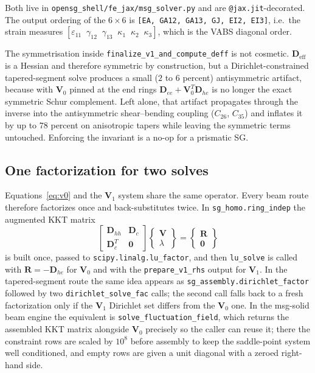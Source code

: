 Both live in \texttt{opensg\_shell/fe\_jax/msg\_solver.py} and are
\texttt{@jax.jit}-decorated. The output ordering of the $6\times6$ is
\texttt{[EA, GA12, GA13, GJ, EI2, EI3]}, i.e.\ the strain measures
$[\varepsilon_{11}\;\;\gamma_{12}\;\;\gamma_{13}\;\;\kappa_1\;\;\kappa_2\;\;\kappa_3]$,
which is the VABS diagonal order.

The symmetrisation inside \texttt{finalize\_v1\_and\_compute\_deff} is not
cosmetic. $\mathbf{D}_{\mathrm{eff}}$ is a Hessian and therefore symmetric by
construction, but a Dirichlet-constrained tapered-segment solve produces a small
($2$ to $6$ percent) antisymmetric artifact, because with $\mathbf{V}_0$ pinned
at the end rings $\mathbf{D}_{ee}+\mathbf{V}_0^{T}\mathbf{D}_{he}$ is no longer
the exact symmetric Schur complement. Left alone, that artifact propagates
through the inverse into the antisymmetric shear--bending coupling ($C_{26}$,
$C_{35}$) and inflates it by up to $78$ percent on anisotropic tapers while
leaving the symmetric terms untouched. Enforcing the invariant is a no-op for a
prismatic SG.

\subsection{One factorization for two solves}

Equations~\eqref{eq:v0} and the $\mathbf{V}_1$ system share the same operator.
Every beam route therefore factorizes once and back-substitutes twice. In
\texttt{sg\_homo.ring\_indep} the augmented KKT matrix
\[
\begin{bmatrix}
\mathbf{D}_{hh} & \mathbf{D}_c\\[2pt]
\mathbf{D}_c^{T} & \mathbf{0}
\end{bmatrix}
\begin{Bmatrix}\mathbf{V}\\ \lambda\end{Bmatrix}
=
\begin{Bmatrix}\mathbf{R}\\ \mathbf{0}\end{Bmatrix}
\]
is built once, passed to \texttt{scipy.linalg.lu\_factor}, and then
\texttt{lu\_solve} is called with $\mathbf{R}=-\mathbf{D}_{he}$ for
$\mathbf{V}_0$ and with the \texttt{prepare\_v1\_rhs} output for
$\mathbf{V}_1$. In the tapered-segment route the same idea appears as
\texttt{sg\_assembly.dirichlet\_factor} followed by two
\texttt{dirichlet\_solve\_fac} calls; the second call falls back to a fresh
factorization only if the $\mathbf{V}_1$ Dirichlet set differs from the
$\mathbf{V}_0$ one. In the msg-solid beam engine the equivalent is
\texttt{solve\_fluctuation\_field}, which returns the assembled KKT matrix
alongside $\mathbf{V}_0$ precisely so the caller can reuse it; there the
constraint rows are scaled by $10^{8}$ before assembly to keep the saddle-point
system well conditioned, and empty rows are given a unit diagonal with a zeroed
right-hand side.

